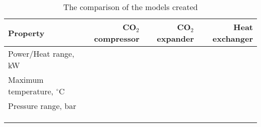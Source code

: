 \begin{table}
\label{tab:DiscussionComparison}
\caption{The comparison of the models created}
\begin{center}
\begin{tabulary}{0.9\textwidth}{LRRR}
\toprule
Property 	&	CO$_2$ compressor & CO$_2$	expander & Heat exchanger \\
\midrule
Power/Heat range, kW& & & \\
Maximum temperature, $^\circ$C& & & \\
Pressure range, bar& & & \\
& & & \\
& & & \\
& & & \\
\bottomrule
\end{tabulary}
\end{center}
\end{table}